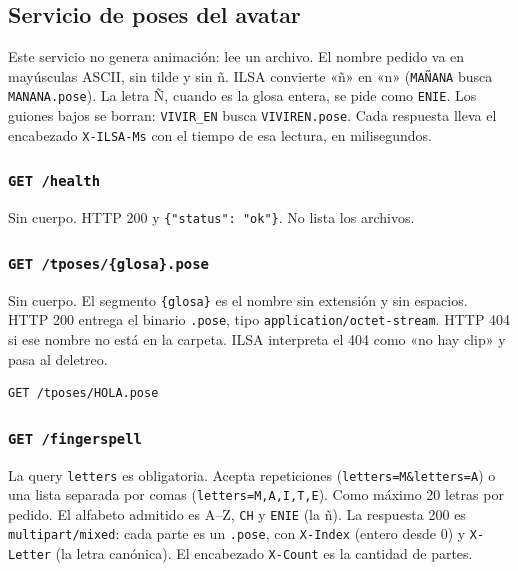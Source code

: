\subsection{Servicio de poses del avatar}
\label{sec:contrato-api-avatar}

Este servicio no genera animación: lee un archivo. El nombre pedido va en mayúsculas ASCII, sin tilde y sin ñ. ILSA convierte «ñ» en «n» (\texttt{MAÑANA} busca \texttt{MANANA.pose}). La letra Ñ, cuando es la glosa entera, se pide como \texttt{ENIE}. Los guiones bajos se borran: \texttt{VIVIR\_EN} busca \texttt{VIVIREN.pose}. Cada respuesta lleva el encabezado \texttt{X-ILSA-Ms} con el tiempo de esa lectura, en milisegundos.

\subsubsection{\texttt{GET /health}}

Sin cuerpo. HTTP 200 y \texttt{\{"status": "ok"\}}. No lista los archivos.

\subsubsection{\texttt{GET /tposes/\{glosa\}.pose}}

Sin cuerpo. El segmento \texttt{\{glosa\}} es el nombre sin extensión y sin espacios. HTTP 200 entrega el binario \texttt{.pose}, tipo \texttt{application/octet-stream}. HTTP 404 si ese nombre no está en la carpeta. ILSA interpreta el 404 como «no hay clip» y pasa al deletreo.

\begin{lstlisting}
GET /tposes/HOLA.pose
\end{lstlisting}

\subsubsection{\texttt{GET /fingerspell}}

La query \texttt{letters} es obligatoria. Acepta repeticiones (\texttt{letters=M\&letters=A}) o una lista separada por comas (\texttt{letters=M,A,I,T,E}). Como máximo 20 letras por pedido. El alfabeto admitido es A--Z, \texttt{CH} y \texttt{ENIE} (la ñ). La respuesta 200 es \texttt{multipart/mixed}: cada parte es un \texttt{.pose}, con \texttt{X-Index} (entero desde 0) y \texttt{X-Letter} (la letra canónica). El encabezado \texttt{X-Count} es la cantidad de partes.

